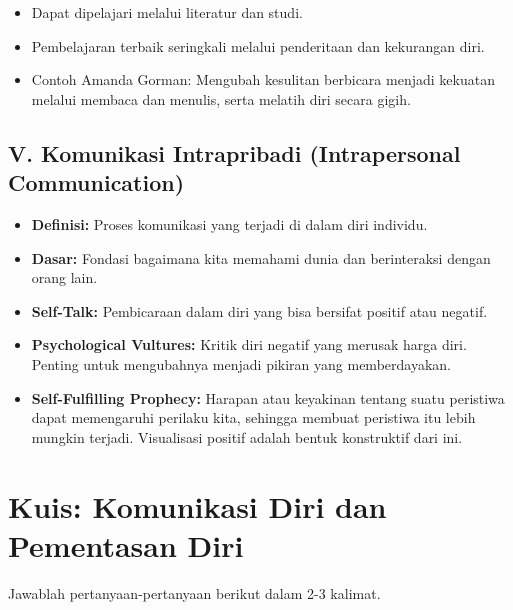 \documentclass[
  letterpaper,
  DIV=11,
  numbers=noendperiod]{scrreprt}
\providecommand{\tightlist}{%
  \setlength{\itemsep}{0pt}\setlength{\parskip}{0pt}}
\begin{document}
\begin{itemize}
\tightlist
\item
  Dapat dipelajari melalui literatur dan studi.
\item
  Pembelajaran terbaik seringkali melalui penderitaan dan kekurangan
  diri.
\item
  Contoh Amanda Gorman: Mengubah kesulitan berbicara menjadi kekuatan
  melalui membaca dan menulis, serta melatih diri secara gigih.
\end{itemize}

\section{V. Komunikasi Intrapribadi (Intrapersonal
Communication)}\label{v.-komunikasi-intrapribadi-intrapersonal-communication}

\begin{itemize}
\tightlist
\item
  \textbf{Definisi:} Proses komunikasi yang terjadi di dalam diri
  individu.
\item
  \textbf{Dasar:} Fondasi bagaimana kita memahami dunia dan berinteraksi
  dengan orang lain.
\item
  \textbf{Self-Talk:} Pembicaraan dalam diri yang bisa bersifat positif
  atau negatif.
\item
  \textbf{Psychological Vultures:} Kritik diri negatif yang merusak
  harga diri. Penting untuk mengubahnya menjadi pikiran yang
  memberdayakan.
\item
  \textbf{Self-Fulfilling Prophecy:} Harapan atau keyakinan tentang
  suatu peristiwa dapat memengaruhi perilaku kita, sehingga membuat
  peristiwa itu lebih mungkin terjadi. Visualisasi positif adalah bentuk
  konstruktif dari ini.
\end{itemize}


\chapter{Kuis: Komunikasi Diri dan Pementasan
Diri}\label{kuis-komunikasi-diri-dan-pementasan-diri}

Jawablah pertanyaan-pertanyaan berikut dalam 2-3 kalimat.
\end{document}
